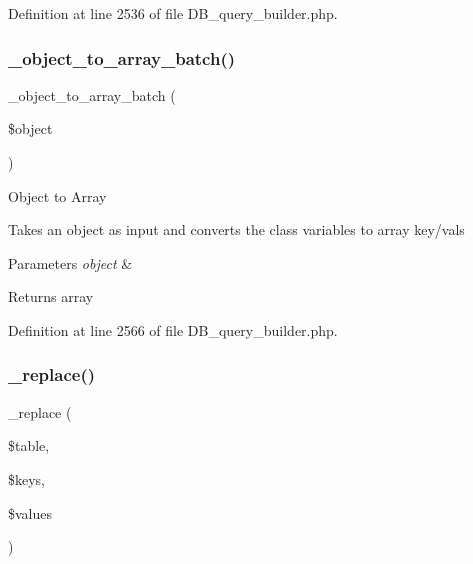 Definition at line 2536 of file D\+B\+\_\+query\+\_\+builder.\+php.

\mbox{\label{class_c_i___d_b__query__builder_ab53f659c5df0b0b6d30eaab74f507dc5}} 
\subsubsection{\texorpdfstring{\_object\_to\_array\_batch()}{\_object\_to\_array\_batch()}}
{\footnotesize\ttfamily \+\_\+object\+\_\+to\+\_\+array\+\_\+batch (\begin{DoxyParamCaption}\item[{}]{\$object }\end{DoxyParamCaption})\hspace{0.3cm}{\ttfamily [protected]}}

Object to Array

Takes an object as input and converts the class variables to array key/vals


\begin{DoxyParams}{Parameters}
{\em object} & \\
\hline
\end{DoxyParams}
\begin{DoxyReturn}{Returns}
array 
\end{DoxyReturn}


Definition at line 2566 of file D\+B\+\_\+query\+\_\+builder.\+php.

\mbox{\label{class_c_i___d_b__query__builder_ae0adf73984daf2d42ad29b66c484c82b}} 
\subsubsection{\texorpdfstring{\_replace()}{\_replace()}}
{\footnotesize\ttfamily \+\_\+replace (\begin{DoxyParamCaption}\item[{}]{\$table,  }\item[{}]{\$keys,  }\item[{}]{\$values }\end{DoxyParamCaption})\hspace{0.3cm}{\ttfamily [protected]}}

